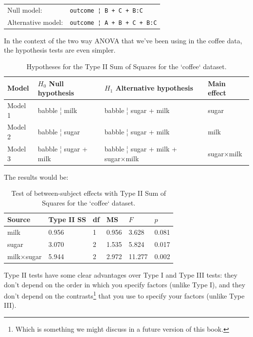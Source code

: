 \documentclass[
  11pt,
  a4paper,
  twoside,symmetric,openright]{book}
\theoremstyle{break}
\theoremstyle{break}
\begin{document}
\begin{longtable}[]{@{}ll@{}}
\toprule\noalign{}
\endhead
\bottomrule\noalign{}
\endlastfoot
Null model: & \texttt{outcome\ ¦\ B\ +\ C\ +\ B:C} \\
Alternative model: & \texttt{outcome\ ¦\ A\ +\ B\ +\ C\ +\ B:C} \\
\end{longtable}

In the context of the two way ANOVA that we've been using in the coffee data, the hypothesis tests are even simpler.

\begin{table}[!h]

\caption{\label{tab:unnamed-chunk-104}Hypotheses for the Type II Sum of Squares for the `coffee` dataset.}
\centering
\begin{tabular}[t]{llll}
\toprule
Model & $H_0$ Null hypothesis & $H_1$ Alternative hypothesis & Main effect\\
\midrule
Model 1 & babble ¦ milk & babble ¦ sugar + milk & sugar\\
Model 2 & babble ¦ sugar & babble ¦ sugar + milk & milk\\
Model 3 & babble ¦ sugar + milk & babble ¦ sugar + milk + sugar×milk & sugar×milk\\
\bottomrule
\end{tabular}
\end{table}

The results would be:

\begin{table}[!h]

\caption{\label{tab:unnamed-chunk-105}Test of between-subject effects with Type II Sum of Squares for the `coffee` dataset.}
\centering
\begin{tabular}[t]{llllll}
\toprule
Source & Type II SS & df & MS & $F$ & $p$\\
\midrule
milk & 0.956 & 1 & 0.956 & 3.628 & 0.081\\
sugar & 3.070 & 2 & 1.535 & 5.824 & 0.017\\
milk×sugar & 5.944 & 2 & 2.972 & 11.277 & 0.002\\
\bottomrule
\end{tabular}
\end{table}

Type II tests have some clear advantages over Type I and Type III tests: they don't depend on the order in which you specify factors (unlike Type I), and they don't depend on the contrasts\footnote{Which is something we might discuss in a future version of this book.} that you use to specify your factors (unlike Type III).
\end{document}
